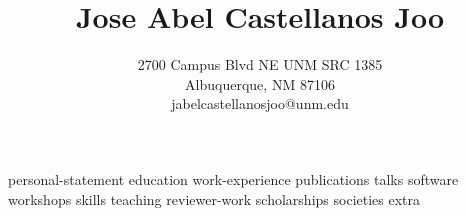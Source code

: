 \documentclass[10pt]{article}
\author{2700 Campus Blvd NE UNM SRC 1385\\
Albuquerque, NM 87106\\
jabelcastellanosjoo@unm.edu}
\title{Jose Abel Castellanos Joo}
\date{}
\begin{document}
\maketitle

{personal-statement}
{education}
{work-experience}
{publications}
{talks}
{software}
{workshops}
{skills}
{teaching}
{reviewer-work}
{scholarships}
{societies}
{extra}
\end{document}
